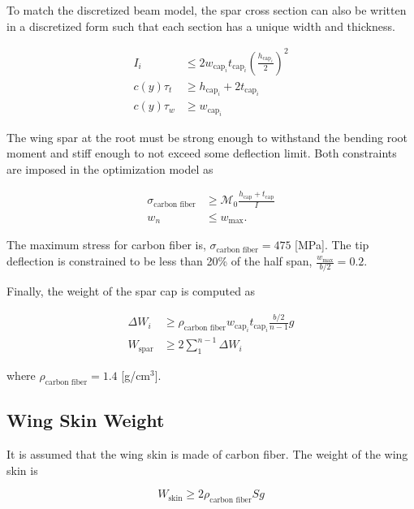 \documentclass[]{aiaa-tc}%
\begin{document}
To match the discretized beam model, the spar cross section can also be written in a discretized form such that each section has a unique width and thickness. 

\begin{align}
    I_i &\leq 2w_{\text{cap}_i}t_{\text{cap}_i}\left(\frac{h_{\text{cap}_i}}{2}\right)^2 \\
    c(y)\tau_t &\geq h_{\text{cap}_i} + 2t_{\text{cap}_i} \\
    c(y)\tau_w &\geq w_{\text{cap}_i} 
\end{align}

The wing spar at the root must be strong enough to withstand the bending root moment and stiff enough to not exceed some deflection limit.  Both constraints are imposed in the optimization model as

\begin{align}
    \label{e:stresscont}
    \sigma_{\text{carbon fiber}} &\geq \mathcal{M}_0 \frac{h_{\text{cap}}+t_{\text{cap}}}{I}\\
    \label{e:defcont}
    w_n &\leq w_{\text{max}}.
\end{align}

The maximum stress for carbon fiber is, $\sigma_{\text{carbon fiber}} = 475$ [MPa].\cite{carbonfiber}
The tip deflection is constrained to be less than 20\% of the half span, $\frac{w_{\text{max}}}{b/2} = 0.2$.

Finally, the weight of the spar cap is computed as

\begin{align}
    \label{e:sparmass}
    \Delta W_i &\geq \rho_{\text{carbon fiber}} w_{\text{cap}_i}t_{\text{cap}_i} \frac{b/2}{n-1}g \\
    \label{e:sparmasssum}
    W_{\text{spar}} &\geq 2 \sum\limits_{1}^{n-1} \Delta W_i
\end{align}

where $\rho_{\text{carbon fiber}} = 1.4$ [g/cm$^3$].\cite{carbonfiber}

\subsection{Wing Skin Weight}

It is assumed that the wing skin is made of carbon fiber.  The weight of the wing skin is 

\begin{equation}
    \label{e:wingskinweight}
    W_{\text{skin}} \geq 2 \rho_{\text{carbon fiber}} S g 
\end{equation}
\end{document}
